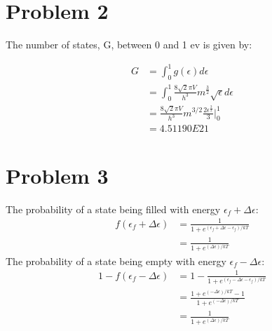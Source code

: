 \documentclass{article}
\numberwithin{equation}{section}
\begin{document}
\section*{Problem 2}
The number of states, G, between 0 and 1 ev is given by:

\begin{align*}
	G &= \int_0^1 g(\epsilon)d\epsilon
\\       &= \int_0^1 \frac {8\sqrt{2} \pi V}{h^3}m^{\frac{3}{2}}\sqrt{\epsilon}d\epsilon
\\       &= \frac {8\sqrt{2} \pi V}{h^3}m^{3/2}\frac{2\epsilon ^{\frac{3}{2}}}{3}|_0^1
\\       &=4.51190E21
\end{align*}

\section*{Problem 3}
The probability of a state being filled with energy $\epsilon_f+\Delta\epsilon$:
\begin{align*}
	f(\epsilon_f+\Delta\epsilon) &= \frac{1}{1+e^{(\epsilon_f+\Delta\epsilon-\epsilon_f)/kT}}
\\       &= \frac{1}{1+e^{(\Delta\epsilon)/kT}}
\end{align*}
The probability of a state being empty with energy $\epsilon_f-\Delta\epsilon$:
\begin{align*}
	1-f(\epsilon_f-\Delta\epsilon) &=1- \frac{1}{1+e^{(\epsilon_f-\Delta\epsilon-\epsilon_f)/kT}}
\\       &= \frac{1+e^{(-\Delta\epsilon)/kT}-1}{1+e^{(-\Delta\epsilon)/kT}}
\\       &= \frac{1}{1+e^{(\Delta\epsilon)/kT}}
\end{align*}
\end{document}
